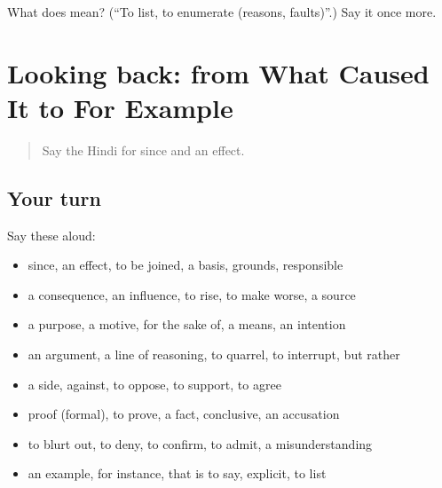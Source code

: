 \begin{tcolorbox}[breakable,colback=teal!4,colframe=teal!35!black,title={Before you move on}]
What does  mean? (\textquotedblleft{}To list, to enumerate (reasons, faults)\textquotedblright{}.) Say it once more.
\end{tcolorbox}
\section[(dialogue)]{Looking back: from What Caused It to For Example}

\label{lesson:HI-R350-review-343-350}



\begin{quote}
Say the Hindi for since and an effect.
\end{quote}

\subsection*{Your turn}
Say these aloud:

\begin{itemize}
\raggedright
  \item since, an effect, to be joined, a basis, grounds, responsible
  \item a consequence, an influence, to rise, to make worse, a source
  \item a purpose, a motive, for the sake of, a means, an intention
  \item an argument, a line of reasoning, to quarrel, to interrupt, but rather
  \item a side, against, to oppose, to support, to agree
  \item proof (formal), to prove, a fact, conclusive, an accusation
  \item to blurt out, to deny, to confirm, to admit, a misunderstanding
  \item an example, for instance, that is to say, explicit, to list
\end{itemize}

